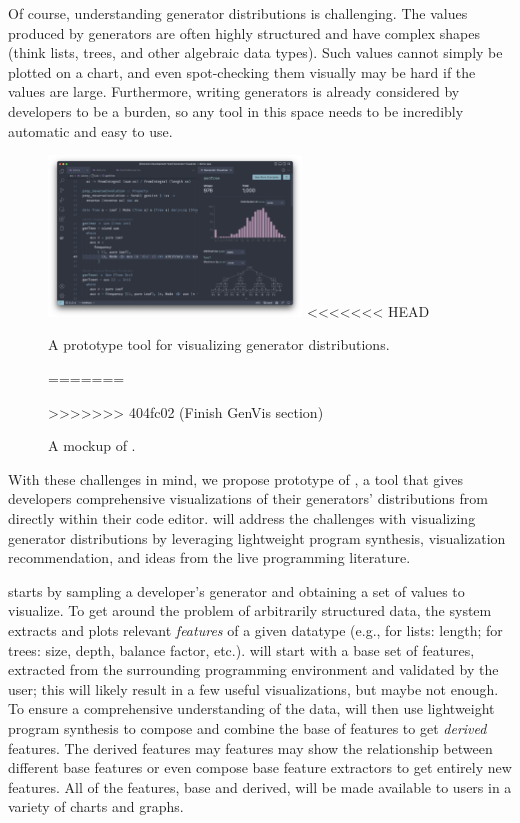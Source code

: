 Of course, understanding generator distributions is challenging.  The values
produced by generators are often highly structured and have complex shapes
(think lists, trees, and other algebraic data types). Such values cannot simply
be plotted on a chart, and even spot-checking them visually may be hard if the
values are large.  Furthermore, writing generators is already considered by
developers to be a burden, so any tool in this space needs to be incredibly
automatic and easy to use.

\begin{figure}
  \centering
  \includegraphics[width=0.6\textwidth]{assets/gen-vis.png}
<<<<<<< HEAD
  \caption{A prototype tool for visualizing generator distributions.}\label{fig:gen-vis}
\iflater{}\fi
=======
  \caption{A mockup of \genvis.}\label{fig:gen-vis}
>>>>>>> 404fc02 (Finish GenVis section)
\end{figure}

With these challenges in mind, we propose prototype of \genvis, a tool that
gives developers comprehensive visualizations of their generators' distributions
from directly within their code editor. \genvis{} will address the challenges
with visualizing generator distributions by leveraging lightweight program
synthesis, visualization recommendation, and ideas from the live programming
literature.

\genvis{} starts by sampling a developer's generator and obtaining a set of
values to visualize. To get around the problem of arbitrarily structured data,
the system extracts and plots relevant {\em features} of a given datatype (e.g.,
for lists: length; for trees: size, depth, balance factor, etc.). \genvis{} will
start with a base set of features, extracted from the surrounding programming
environment and validated by the user; this will likely result in a few useful
visualizations, but maybe not enough. To ensure a comprehensive understanding of
the data, \genvis{} will then use lightweight program synthesis to compose and
combine the base of features to get {\em derived} features. The derived features
may features may show the relationship between different base features or even
compose base feature extractors to get entirely new features. All of the
features, base and derived, will be made available to users in a variety of
charts and graphs.

